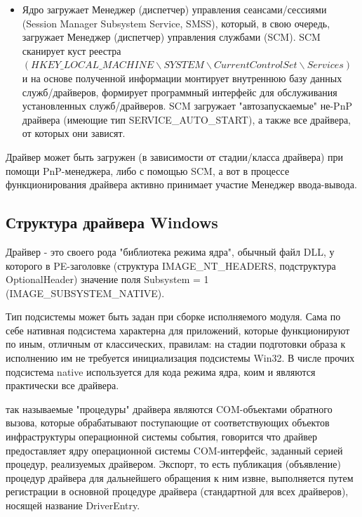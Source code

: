 \documentclass[14pt,a4paper]{article}
\begin{document}
\begin{itemize}
    \item Ядро загружает Менеджер (диспетчер) управления сеансами/сессиями (Session Manager Subsystem Service, SMSS), который, в свою очередь, загружает Менеджер (диспетчер) управления службами (SCM). SCM сканирует куст реестра \begin{math} (HKEY\_LOCAL\_MACHINE \backslash SYSTEM \backslash CurrentControlSet \backslash Services) \end{math} и на основе полученной информации монтирует внутреннюю базу данных служб/драйверов, формирует программный интерфейс для обслуживания установленных служб/драйверов. SCM загружает "автозапускаемые" не-PnP драйвера (имеющие тип SERVICE\_AUTO\_START), а также все драйвера, от которых они зависят.
\end{itemize}

\par Драйвер может быть загружен (в зависимости от стадии/класса драйвера) при помощи PnP-менеджера, либо с помощью SCM, а вот в процессе функционирования драйвера активно принимает участие Менеджер ввода-вывода.

\subsection{Структура драйвера Windows}
\par Драйвер - это своего рода "библиотека режима ядра", обычный файл DLL, у которого в PE-заголовке (структура IMAGE\_NT\_HEADERS, подструктура OptionalHeader) значение поля Subsystem = 1 (IMAGE\_SUBSYSTEM\_NATIVE).\\

\par Тип подсистемы может быть задан при сборке исполняемого модуля. Сама по себе нативная подсистема характерна для приложений, которые функционируют по иным, отличным от классических, правилам: на стадии подготовки образа к исполнению им не требуется инициализация подсистемы Win32. В числе прочих подсистема native используется для кода режима ядра, коим и являются практически все драйвера.\\

\par так называемые "процедуры" драйвера являются COM-объектами обратного вызова, которые обрабатывают поступающие от соответствующих объектов инфраструктуры операционной системы события, говорится что драйвер предоставляет ядру операционной системы COM-интерфейс, заданный серией процедур, реализуемых драйвером. Экспорт, то есть публикация (объявление) процедур драйвера для дальнейшего обращения к ним извне, выполняется путем регистрации в основной процедуре драйвера (стандартной для всех драйверов), носящей название DriverEntry.\\
\end{document}
